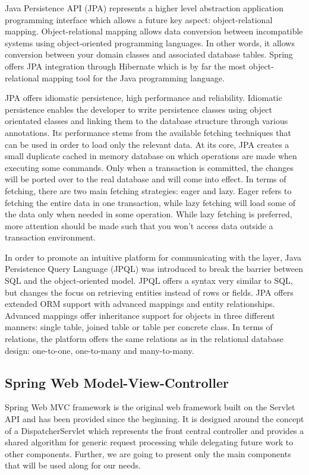 Java Persistence API (JPA) represents a higher level abstraction application programming interface which allows a future key aspect: object-relational mapping. Object-relational mapping allows data conversion between incompatible systems using object-oriented programming languages. In other words, it allows conversion between your domain classes and associated database tables. Spring offers JPA integration through Hibernate which is by far the most object-relational mapping tool for the Java programming language.

JPA offers idiomatic persistence, high performance and reliability. Idiomatic persistence enables the developer to write persistence classes using object orientated classes and linking them to the database structure through various annotations. Its performance stems from the available fetching techniques that can be used in order to load only the relevant data. At its core, JPA creates a small duplicate cached in memory database on which operations are made when executing some commands. Only when a transaction is committed, the changes will be ported over to the real database and will come into effect. In terms of fetching, there are two main fetching strategies: eager and lazy. Eager refers to fetching the entire data in one transaction, while lazy fetching will load some of the data only when needed in some operation. While lazy fetching is preferred, more attention should be made such that you won't access data outside a transaction environment.

In order to promote an intuitive platform for communicating with the layer, Java Persistence Query Language (JPQL) was introduced to break the barrier between SQL and the object-oriented model. JPQL offers a syntax very similar to SQL, but changes the focus on retrieving entities instead of rows or fields. JPA offers extended ORM support with advanced mappings and entity relationships. Advanced mappings offer inheritance support for objects in three different manners: single table, joined table or table per concrete class. In terms of relations, the platform offers the same relations as in the relational database design: one-to-one, one-to-many and many-to-many.

\subsection*{Spring Web Model-View-Controller}

Spring Web MVC framework is the original web framework built on the Servlet API and has been provided since the beginning. It is designed around the concept of a DispatcherServlet which represents the front central controller and provides a shared algorithm for generic request processing while delegating future work to other components. Further, we are going to present only the main components that will be used along for our needs.

